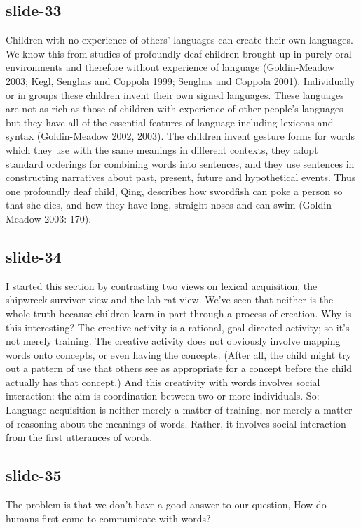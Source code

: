 \documentclass[12pt,\papersize]{extarticle}
\begin{document}
 
\subsection{slide-33}
Children with no experience of others' languages can create their own languages.
We know this from studies of profoundly deaf children brought up in purely oral environments and therefore without experience of language (Goldin-Meadow 2003; Kegl, Senghas and Coppola 1999; Senghas and Coppola 2001).
Individually or in groups these children invent their own signed languages.
These languages are not as rich as those of children with experience of other people's languages but they have all of the essential features of language including lexicons and syntax (Goldin-Meadow 2002, 2003).
The children invent gesture forms for words which they use with the same meanings in different contexts, they adopt standard orderings for combining words into sentences, and they use sentences in constructing narratives about past, present, future and hypothetical events. Thus one profoundly deaf child, Qing, describes how swordfish can poke a person so that she dies, and how they have long, straight noses and can swim (Goldin-Meadow 2003: 170).
 
 
\subsection{slide-34}
I started this section by contrasting two views on lexical acquisition, the shipwreck survivor view and the lab rat view.
We've seen that neither is the whole truth because children learn in part through a process of creation.
Why is this interesting?
The creative activity is a rational, goal-directed activity; so it's not merely training.
The creative activity does not obviously involve mapping words onto concepts, or even having the concepts.
(After all, the child might try out a pattern of use that others see as appropriate for a concept before the child actually has that concept.)
And this creativity with words involves social interaction: the aim is coordination between two or more individuals.
So:
Language acquisition is neither merely a matter of training, nor merely a matter of reasoning about the meanings of words. Rather, it involves social interaction from the first utterances of words.
 
 
\subsection{slide-35}
The problem is that we don't have a good answer to our question, How do humans first come to communicate with words?
 
\end{document}
